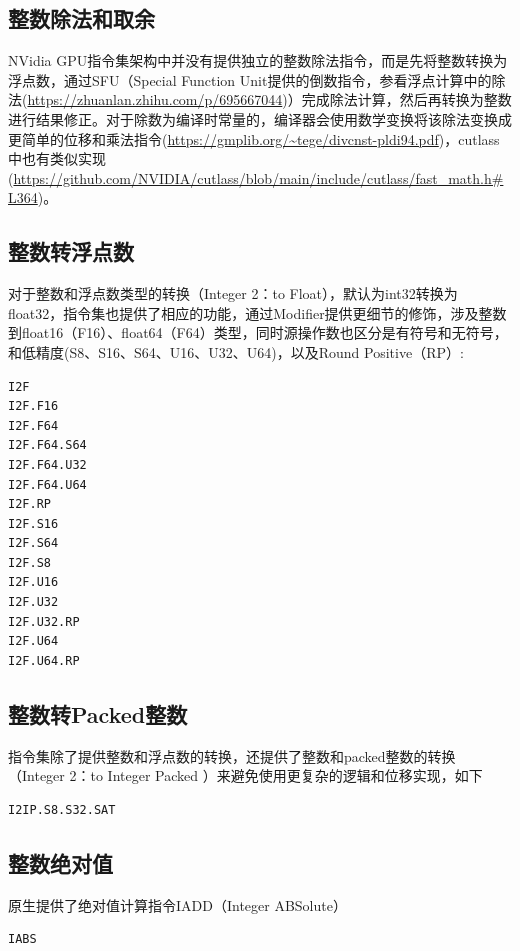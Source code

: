 \subsection{整数除法和取余}

NVidia GPU指令集架构中并没有提供独立的整数除法指令，而是先将整数转换为浮点数，通过SFU（Special Function Unit提供的倒数指令，参看浮点计算中的除法(\url{https://zhuanlan.zhihu.com/p/695667044})）完成除法计算，然后再转换为整数进行结果修正。对于除数为编译时常量的，编译器会使用数学变换将该除法变换成更简单的位移和乘法指令(\url{https://gmplib.org/~tege/divcnst-pldi94.pdf})，cutlass中也有类似实现(\url{https://github.com/NVIDIA/cutlass/blob/main/include/cutlass/fast_math.h#L364})。

\subsection{整数转浮点数}

对于整数和浮点数类型的转换（Integer 2：to Float），默认为int32转换为float32，指令集也提供了相应的功能，通过Modifier提供更细节的修饰，涉及整数到float16（F16）、float64（F64）类型，同时源操作数也区分是有符号和无符号，和低精度(S8、S16、S64、U16、U32、U64)，以及Round Positive（RP）:

\begin{lstlisting}
I2F
I2F.F16
I2F.F64
I2F.F64.S64
I2F.F64.U32
I2F.F64.U64
I2F.RP
I2F.S16
I2F.S64
I2F.S8
I2F.U16
I2F.U32
I2F.U32.RP
I2F.U64
I2F.U64.RP
\end{lstlisting}

\subsection{整数转Packed整数}

指令集除了提供整数和浮点数的转换，还提供了整数和packed整数的转换（Integer 2：to Integer Packed ）来避免使用更复杂的逻辑和位移实现，如下

\begin{lstlisting}
I2IP.S8.S32.SAT
\end{lstlisting}

\subsection{整数绝对值}

原生提供了绝对值计算指令IADD（Integer ABSolute）

\begin{lstlisting}
IABS
\end{lstlisting}

